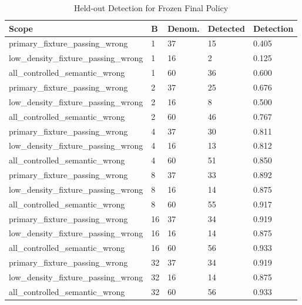 \begin{table}[t]
\centering
\small
\begin{tabular}{lllll}
\toprule
Scope & B & Denom. & Detected & Detection \\
\midrule
primary\_fixture\_passing\_wrong & 1 & 37 & 15 & 0.405 \\
low\_density\_fixture\_passing\_wrong & 1 & 16 & 2 & 0.125 \\
all\_controlled\_semantic\_wrong & 1 & 60 & 36 & 0.600 \\
primary\_fixture\_passing\_wrong & 2 & 37 & 25 & 0.676 \\
low\_density\_fixture\_passing\_wrong & 2 & 16 & 8 & 0.500 \\
all\_controlled\_semantic\_wrong & 2 & 60 & 46 & 0.767 \\
primary\_fixture\_passing\_wrong & 4 & 37 & 30 & 0.811 \\
low\_density\_fixture\_passing\_wrong & 4 & 16 & 13 & 0.812 \\
all\_controlled\_semantic\_wrong & 4 & 60 & 51 & 0.850 \\
primary\_fixture\_passing\_wrong & 8 & 37 & 33 & 0.892 \\
low\_density\_fixture\_passing\_wrong & 8 & 16 & 14 & 0.875 \\
all\_controlled\_semantic\_wrong & 8 & 60 & 55 & 0.917 \\
primary\_fixture\_passing\_wrong & 16 & 37 & 34 & 0.919 \\
low\_density\_fixture\_passing\_wrong & 16 & 16 & 14 & 0.875 \\
all\_controlled\_semantic\_wrong & 16 & 60 & 56 & 0.933 \\
primary\_fixture\_passing\_wrong & 32 & 37 & 34 & 0.919 \\
low\_density\_fixture\_passing\_wrong & 32 & 16 & 14 & 0.875 \\
all\_controlled\_semantic\_wrong & 32 & 60 & 56 & 0.933 \\
\bottomrule
\end{tabular}
\caption{Held-out Detection for Frozen Final Policy}
\end{table}
